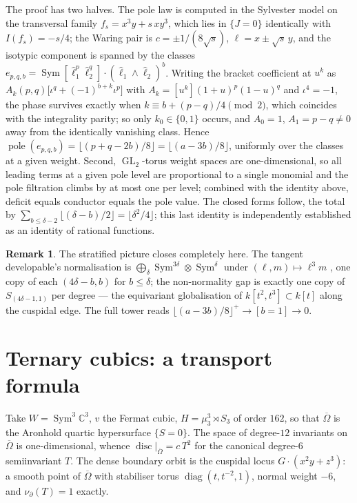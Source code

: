\documentclass[11pt,reqno]{amsart}
\theoremstyle{plain}
\theoremstyle{definition}
\newtheorem{remark}[theorem]{Remark}
\DeclareMathOperator{\GL}{GL}
\DeclareMathOperator{\Sym}{Sym}
\newcommand{\cO}{\overline{\Omega}}
\newcommand{\bC}{\mathbb{C}}
\begin{document}
The proof has two halves.  The pole law is computed in the Sylvester model on
the transversal family $f_s=x^{3}y+s\,xy^{3}$, which lies in $\{J=0\}$
identically with $I(f_s)=-s/4$; the Waring pair is $c=\pm 1/(8\sqrt s)$,
$\ell=x\pm\sqrt s\,y$, and the isotypic component is spanned by the classes
$e_{p,q,b}=\Sym[\hat\ell_1^{p}\hat\ell_2^{q}]\cdot(\hat\ell_1\wedge\hat\ell_2)^{b}$.
Writing the bracket coefficient at $u^{k}$ as
$A_k(p,q)\big[\iota^{q}+(-1)^{b+k}\iota^{p}\big]$ with
$A_k=[u^{k}](1+u)^{p}(1-u)^{q}$ and $\iota^{4}=-1$, the phase survives exactly
when $k\equiv b+(p-q)/4\pmod 2$, which coincides with the integrality parity;
so only $k_0\in\{0,1\}$ occurs, and $A_0=1$, $A_1=p-q\ne 0$ away from the
identically vanishing class.  Hence
$\operatorname{pole}(e_{p,q,b})=\lfloor (p+q-2b)/8\rfloor=\lfloor(a-3b)/8\rfloor$,
uniformly over the classes at a given weight.  Second, $\GL_2$-torus weight
spaces are one-dimensional, so all leading terms at a given pole level are
proportional to a single monomial and the pole filtration climbs by at most one
per level; combined with the identity above, deficit equals conductor equals
the pole value.  The closed forms follow, the total by
$\sum_{b\le\delta-2}\lfloor(\delta-b)/2\rfloor=\lfloor\delta^{2}/4\rfloor$;
this last identity is independently established as an identity of rational
functions.

\begin{remark}
The stratified picture closes completely here.  The tangent developable's
normalisation is $\bigoplus_\delta \Sym^{3\delta}\otimes\Sym^{\delta}$ under
$(\ell,m)\mapsto \ell^{3}m$ \cite{AFPRW}, one copy of each $(4\delta-b,b)$ for
$b\le\delta$; the non-normality gap is exactly one copy of
$S_{(4\delta-1,1)}$ per degree --- the equivariant globalisation of
$k[t^{2},t^{3}]\subset k[t]$ along the cuspidal edge.  The full tower reads
$\lfloor(a-3b)/8\rfloor^{+}\to[b=1]\to 0$.
\end{remark}

\section{Ternary cubics: a transport formula}\label{sec:worldB}

Take $W=\Sym^{3}\bC^{3}$, $v$ the Fermat cubic, $H=\mu_3^{3}\rtimes S_3$ of
order $162$, so that $\cO$ is the Aronhold quartic hypersurface $\{S=0\}$.  The
space of degree-$12$ invariants on $\cO$ is one-dimensional, whence
$\operatorname{disc}|_{\cO}=c\,T^{2}$ for the canonical degree-$6$
semiinvariant $T$.  The dense boundary orbit is the cuspidal locus
$G\cdot(x^{2}y+z^{3})$: a smooth point of $\cO$ with stabiliser torus
$\operatorname{diag}(t,t^{-2},1)$, normal weight $-6$, and
$\nu_{\partial}(T)=1$ exactly.
\end{document}
